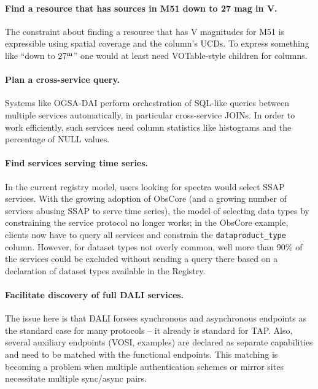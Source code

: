 \documentclass[11pt,a4paper]{ivoa}
\begin{document}
\paragraph{Find a resource that has sources in M51 down to 27 mag in V.}
The constraint about finding a resource that has V magnitudes for M51 is
expressible using spatial coverage and the column's UCDs.  To express
something like ``down to $27^{\rm m}$'' one would at least need
VOTable-style  children for columns.

\paragraph{Plan a cross-service query.} Systems like OGSA-DAI
\citep{2011ASPC..442..579H} perform orchestration of SQL-like queries
between multiple services automatically, in particular cross-service
JOINs.  In order to work efficiently, such services need column
statistics like histograms and the percentage of NULL values.

\paragraph{Find services serving time series.} In the current registry
model, users looking for spectra would select SSAP services.  With the
growing adoption of ObsCore (and a growing number of services abusing
SSAP to serve time series), the model of selecting data types by
constraining the service protocol no longer works; in the ObsCore
example, clients now have to query all services and constrain the
\verb|dataproduct_type| column. However, for dataset types not overly
common, well more than 90\% of the services could be excluded without
sending a query there based on a declaration of dataset types available
in the Registry.

\paragraph{Facilitate discovery of full DALI services.}  The issue here
is that DALI forsees synchronous and asynchronous endpoints as the
standard case for many protocols -- it already is standard for TAP.
Also, several auxiliary endpoints (VOSI, examples) are declared as
separate capabilities and need to be matched with the functional endpoints.
This matching is becoming a problem when multiple 
authentication schemes or mirror sites
necessitate multiple sync/async pairs.
\end{document}
